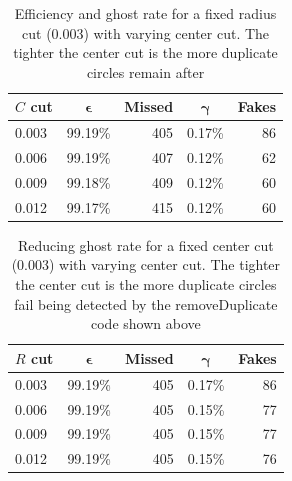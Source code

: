 \documentclass[11pt,twoside]{scrreprt}
\begin{document}
\begin{table}[htbp]
  \caption{Efficiency and ghost rate for a fixed radius cut (0.003) with varying center cut. The tighter the center cut is
  the more duplicate circles remain after }
  \label{tab:cut_variation_1}
  \centering

  \begin{tabular}{lcrcr}
  \toprule
  \textbf{$C$ cut} & $\boldsymbol{\epsilon}$ & \textbf{Missed} & $\boldsymbol{\gamma}$ & \textbf{Fakes} \\
  \midrule
  0.003 & 99.19\% & 405 & 0.17\% & 86 \\
  0.006 & 99.19\% & 407 & 0.12\% & 62 \\
  0.009 & 99.18\% & 409 & 0.12\% & 60 \\
  0.012 & 99.17\% & 415 & 0.12\% & 60 \\
    \bottomrule
  \end{tabular}
\end{table}

\begin{table}[htbp]
  \caption{Reducing ghost rate for a fixed center cut (0.003) with varying center cut. The tighter the center cut is
  the more duplicate circles fail being detected by the removeDuplicate code shown above}
  \label{tab:cut_variation_2}
  \centering

  \begin{tabular}{lcrcr}
  \toprule
  \textbf{$R$ cut} & $\boldsymbol{\epsilon}$ & \textbf{Missed} & $\boldsymbol{\gamma}$ & \textbf{Fakes} \\
  \midrule
  0.003 & 99.19\% & 405 & 0.17\% & 86 \\
  0.006 & 99.19\% & 405 & 0.15\% & 77 \\
  0.009 & 99.19\% & 405 & 0.15\% & 77 \\
  0.012 & 99.19\% & 405 & 0.15\% & 76 \\
  \bottomrule
  \end{tabular}
\end{table}
\end{document}

